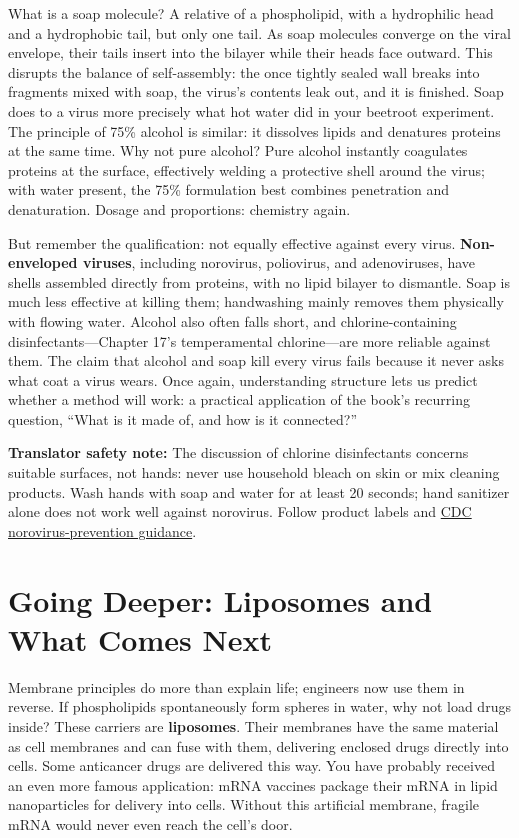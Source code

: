 What is a soap molecule? A relative of a phospholipid, with a hydrophilic head and a hydrophobic tail, but only one tail. As soap molecules converge on the viral envelope, their tails insert into the bilayer while their heads face outward. This disrupts the balance of self-assembly: the once tightly sealed wall breaks into fragments mixed with soap, the virus's contents leak out, and it is finished. Soap does to a virus more precisely what hot water did in your beetroot experiment. The principle of 75\% alcohol is similar: it dissolves lipids and denatures proteins at the same time. Why not pure alcohol? Pure alcohol instantly coagulates proteins at the surface, effectively welding a protective shell around the virus; with water present, the 75\% formulation best combines penetration and denaturation. Dosage and proportions: chemistry again.

But remember the qualification: not equally effective against every virus. \textbf{Non-enveloped viruses}, including norovirus, poliovirus, and adenoviruses, have shells assembled directly from proteins, with no lipid bilayer to dismantle. Soap is much less effective at killing them; handwashing mainly removes them physically with flowing water. Alcohol also often falls short, and chlorine-containing disinfectants---Chapter 17's temperamental chlorine---are more reliable against them. The claim that alcohol and soap kill every virus fails because it never asks what coat a virus wears. Once again, understanding structure lets us predict whether a method will work: a practical application of the book's recurring question, ``What is it made of, and how is it connected?''

\textbf{Translator safety note:} The discussion of chlorine disinfectants concerns suitable surfaces, not hands: never use household bleach on skin or mix cleaning products. Wash hands with soap and water for at least 20 seconds; hand sanitizer alone does not work well against norovirus. Follow product labels and \href{https://www.cdc.gov/norovirus/prevention/index.html}{CDC norovirus-prevention guidance}.

\section{Going Deeper: Liposomes and What Comes Next}

Membrane principles do more than explain life; engineers now use them in reverse. If phospholipids spontaneously form spheres in water, why not load drugs inside? These carriers are \textbf{liposomes}. Their membranes have the same material as cell membranes and can fuse with them, delivering enclosed drugs directly into cells. Some anticancer drugs are delivered this way. You have probably received an even more famous application: mRNA vaccines package their mRNA in lipid nanoparticles for delivery into cells. Without this artificial membrane, fragile mRNA would never even reach the cell's door.

